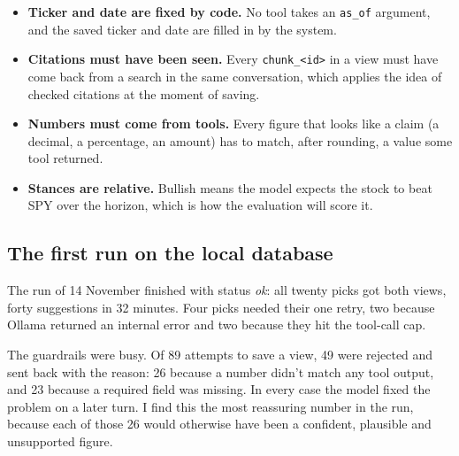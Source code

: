\documentclass[11pt,a4paper]{article}
\newcommand{\code}[1]{\texttt{#1}}
\begin{document}
\begin{itemize}
  \item \textbf{Ticker and date are fixed by code.} No tool takes an \code{as\_of} argument, and the saved
        ticker and date are filled in by the system.
  \item \textbf{Citations must have been seen.} Every \code{chunk\_<id>} in a view must have come back from
        a search in the same conversation, which applies the idea of checked citations
        \cite{gao2023enabling} at the moment of saving.
  \item \textbf{Numbers must come from tools.} Every figure that looks like a claim (a decimal, a
        percentage, an amount) has to match, after rounding, a value some tool returned.
  \item \textbf{Stances are relative.} Bullish means the model expects the stock to beat SPY over the
        horizon, which is how the evaluation will score it.
\end{itemize}

\subsection{The first run on the local database}

The run of 14 November finished with status \emph{ok}: all twenty picks got both views, forty
suggestions in 32 minutes. Four picks needed their one retry, two because Ollama returned an internal
error and two because they hit the tool-call cap.

The guardrails were busy. Of 89 attempts to save a view, 49 were rejected and sent back with the reason:
26 because a number didn't match any tool output, and 23 because a required field was missing. In every
case the model fixed the problem on a later turn. I find this the most reassuring number in the run,
because each of those 26 would otherwise have been a confident, plausible and unsupported figure.
\end{document}
